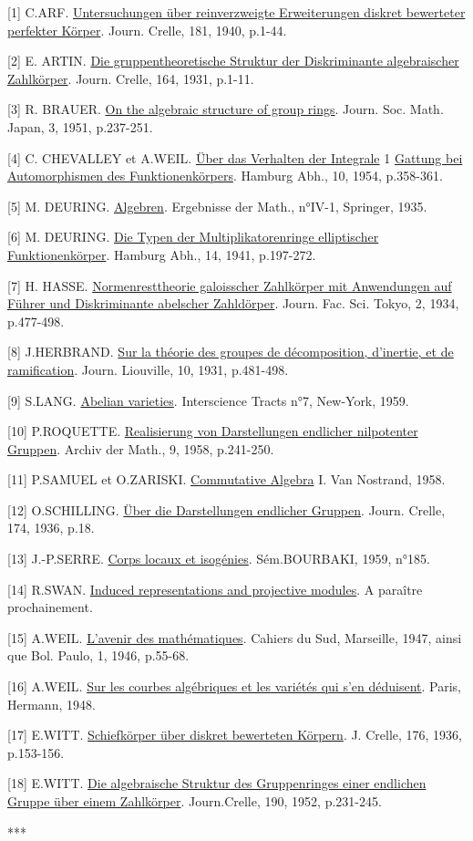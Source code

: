 \begin{center}\end{center}

[1] C.ARF. \uline{Untersuchungen über reinverzweigte Erweiterungen diskret bewerteter perfekter Körper}. Journ. Crelle, 181, 1940, p.1-44.

[2] E. ARTIN. \uline{Die gruppentheoretische Struktur der Diskriminante algebraischer Zahlkörper}. Journ. Crelle, 164, 1931, p.1-11.

[3] R. BRAUER. \uline{On the algebraic structure of group rings}. Journ. Soc. Math. Japan, 3, 1951, p.237-251.

[4] C. CHEVALLEY et A.WEIL. \uline{Über das Verhalten der Integrale} 1 \uline{Gattung bei Automorphismen des Funktionenkörpers}. Hamburg Abh., 10, 1954, p.358-361.

[5] M. DEURING. \uline{Algebren}. Ergebnisse der Math., n°IV-1, Springer, 1935.

[6] M. DEURING. \uline{Die Typen der Multiplikatorenringe elliptischer Funktionenkörper}. Hamburg Abh., 14, 1941, p.197-272.

[7] H. HASSE. \uline{Normenresttheorie galoisscher Zahlkörper mit Anwendungen auf Führer und Diskriminante abelscher Zahldörper}. Journ. Fac. Sci. Tokyo, 2, 1934, p.477-498.

[8] J.HERBRAND. \uline{Sur la théorie des groupes de décomposition, d'inertie, et de ramification}. Journ. Liouville, 10, 1931, p.481-498.

[9] S.LANG. \uline{Abelian varieties}. Interscience Tracts n°7, New-York, 1959.

[10] P.ROQUETTE. \uline{Realisierung von Darstellungen endlicher nilpotenter Gruppen}. Archiv der Math., 9, 1958, p.241-250.

[11] P.SAMUEL et O.ZARISKI. \uline{Commutative Algebra} I. Van Nostrand, 1958.

[12] O.SCHILLING. \uline{Über die Darstellungen endlicher Gruppen}. Journ. Crelle, 174, 1936, p.18.

[13] J.-P.SERRE. \uline{Corps locaux et isogénies}. Sém.BOURBAKI, 1959, n°185.

[14] R.SWAN. \uline{Induced representations and projective modules}. A paraître prochainement.

[15] A.WEIL. \uline{L'avenir des mathématiques}. Cahiers du Sud, Marseille, 1947, ainsi que Bol.  Paulo, 1, 1946, p.55-68.

[16] A.WEIL. \uline{Sur les courbes algébriques et les variétés qui s'en déduisent}. Paris, Hermann, 1948.

[17] E.WITT. \uline{Schiefkörper über diskret bewerteten Körpern}. J. Crelle, 176, 1936, p.153-156.

[18] E.WITT. \uline{Die algebraische Struktur des Gruppenringes einer endlichen Gruppe über einem Zahlkörper}. Journ.Crelle, 190, 1952, p.231-245.

\begin{center}***\end{center}
